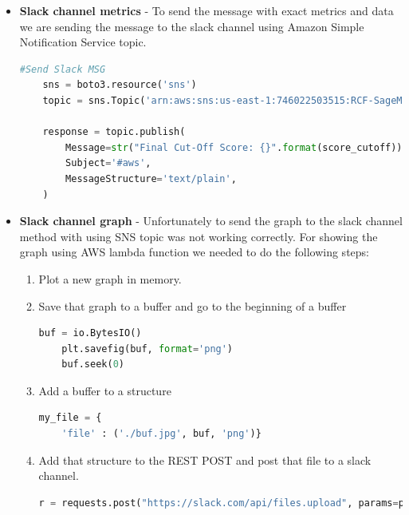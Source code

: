 \begin{itemize}
\item \textbf{Slack channel metrics} - To send the message with exact metrics and data we are sending the message to the slack channel using Amazon Simple Notification Service topic.

\begin{lstlisting}[language=Python, caption=Sending message to slack channel using SNS topic]
    #Send Slack MSG
    sns = boto3.resource('sns')
    topic = sns.Topic('arn:aws:sns:us-east-1:746022503515:RCF-SageMaker')
    
    response = topic.publish(
        Message=str("Final Cut-Off Score: {}".format(score_cutoff)),
        Subject='#aws',
        MessageStructure='text/plain',
    )
\end{lstlisting}
\item \textbf{Slack channel graph} - Unfortunately to send the graph to the slack channel method with using SNS topic was not working correctly. For showing the graph using AWS lambda function we needed to do the following steps:

\begin{enumerate}
\item Plot a new graph in memory.
\item Save that graph to a buffer and go to the beginning of a buffer
\begin{lstlisting}[language=Python, numbers=none]
    buf = io.BytesIO()
    plt.savefig(buf, format='png')
    buf.seek(0)
\end{lstlisting}
\item Add a buffer to a structure
\begin{lstlisting}[language=Python, numbers=none]
    my_file = {
    'file' : ('./buf.jpg', buf, 'png')}
\end{lstlisting}

\item Add that structure to the REST POST and post that file to a slack channel.

\begin{lstlisting}[language=Python, numbers=none]
    r = requests.post("https://slack.com/api/files.upload", params=payload, files=my_file)
\end{lstlisting}

\end{enumerate}
\end{itemize}





